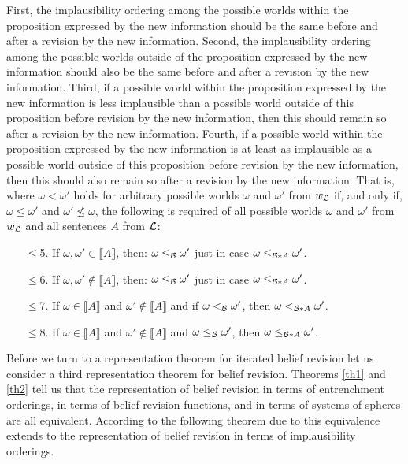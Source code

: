 First, the implausibility ordering among the possible worlds within the proposition expressed by the new information should be the same before and after a revision by the new information. Second, the implausibility ordering among the possible worlds outside of the proposition expressed by the new information should also be the same before and after a revision by the new information. Third, if a possible world within the proposition expressed by the new information is less implausible than a possible world outside of this proposition before revision by the new information, then this should remain so after a revision by the new information. Fourth, if a possible world within the proposition expressed by the new information is at least as implausible as a possible world outside of this proposition before revision by the new information, then this should also remain so after a revision by the new information. That is, where $\omega<\omega'$ holds for arbitrary possible worlds $\omega$ and $\omega'$ from $w_{\cal L}$ if, and only if, $\omega\leq\omega'$ and $\omega'\not\leq\omega$, the following is required of all possible worlds $\omega$ and $\omega'$ from $w_{\cal L}$ and all sentences $A$ from $\cal L$:
\begin{enumerate}
\item[$\leq$5.] If $\omega,\omega'\in\llbracket A\rrbracket$, then: $\omega\leq_{\cal B}\omega'$ just in case $\omega\leq_{\begin{cal}B\end{cal}*A}\omega'$.
\item[$\leq$6.] If $\omega,\omega'\not\in\llbracket A\rrbracket$, then: $\omega\leq_{\cal B}\omega'$ just in case $\omega\leq_{\begin{cal}B\end{cal}*A}\omega'$.
\item[$\leq$7.] If $\omega\in\llbracket A\rrbracket$ and $\omega'\not\in\llbracket A\rrbracket$ and if $\omega<_{\cal B}\omega'$, then $\omega<_{\begin{cal}B\end{cal}*A}\omega'$.
\item[$\leq$8.] If $\omega\in\llbracket A\rrbracket$ and $\omega'\not\in\llbracket A\rrbracket$ and $\omega\leq_{\cal B}\omega'$, then $\omega\leq_{\begin{cal}B\end{cal}*A}\omega'$.
\end{enumerate}
Before we turn to a representation theorem for iterated belief revision let us consider a third representation theorem for belief revision. Theorems \ref{th1} and \ref{th2} tell us that the representation of belief revision in terms of entrenchment orderings, in terms of belief revision functions, and in terms of systems of spheres are all equivalent. According to the following theorem due to \citet{g88} this equivalence extends to the representation of belief revision in terms of implausibility orderings.
